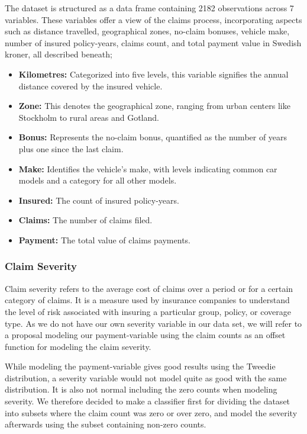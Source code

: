 \documentclass[12pt, twoside,hidelinks]{article}
\theoremstyle{definition}
\numberwithin{equation}{section}
\begin{document}
The dataset is structured as a data frame containing 2182 observations across 7 variables. These variables offer a view of the claims process, incorporating aspects such as distance travelled, geographical zones, no-claim bonuses, vehicle make, number of insured policy-years, claims count, and total payment value in Swedish kroner, all described beneath;


\begin{itemize}
    \item \textbf{Kilometres:} Categorized into five levels, this variable signifies the annual distance covered by the insured vehicle.
    \item \textbf{Zone:} This denotes the geographical zone, ranging from urban centers like Stockholm to rural areas and Gotland.
    \item \textbf{Bonus:} Represents the no-claim bonus, quantified as the number of years plus one since the last claim.
    \item \textbf{Make:} Identifies the vehicle's make, with levels indicating common car models and a category for all other models.
    \item \textbf{Insured:} The count of insured policy-years.
    \item \textbf{Claims:} The number of claims filed.
    \item \textbf{Payment:} The total value of claims payments.
\end{itemize}

\subsubsection*{Claim Severity}

Claim severity refers to the average cost of claims over a period or for a certain category of claims. It is a measure used by insurance companies to understand the level of risk associated with insuring a particular group, policy, or coverage type.  As we do not have our own severity variable in our data set, we will refer to a proposal modeling our payment-variable using the claim counts as an offset function for modeling the claim severity.
\newline

While modeling the payment-variable gives good results using the Tweedie distribution, a severity variable would not model quite as good with the same distribution. It is also not normal including the zero counts when modeling severity. We therefore decided to make a classifier first for dividing the dataset into subsets where the claim count was zero or over zero, and model the severity afterwards using the subset containing non-zero counts.
\end{document}
